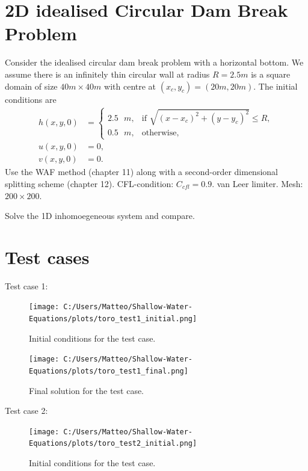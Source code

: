\section{2D idealised Circular Dam Break Problem}
Consider the idealised circular dam break problem with a horizontal bottom.
We assume there is an infinitely thin circular wall at radius $R = 2.5 m$ is a square domain of size $40 m \times 40 m$ with centre at $(x_c,y_c) = (20 m, 20 m)$.
The initial conditions are
\begin{align*}
    h(x,y,0) &= \begin{cases}
        2.5 \text{ }m, & \text{if } \sqrt{ {(x-x_c)}^2 + {(y-y_c)}^2 } \leq R, \\
        0.5 \text{ }m, & \text{otherwise},
    \end{cases} \\
    u(x,y,0) &= 0, \\
    v(x,y,0) &= 0.
\end{align*}
Use the WAF method (chapter 11) along with a second-order dimensional splitting scheme (chapter 12).
CFL-condition: $C_{cfl} = 0.9$.
van Leer limiter. Mesh: $200 \times 200$.

Solve the 1D inhomoegeneous system and compare.


\section{Test cases}

Test case 1:

\begin{figure}[H]
    \centering
    \texttt{[image: C:/Users/Matteo/Shallow-Water-Equations/plots/toro\_test1\_initial.png]}
    \caption{Initial conditions for the test case.}\label{fig:toro_test1_initial}
\end{figure}


\begin{figure}[H]
    \centering
    \texttt{[image: C:/Users/Matteo/Shallow-Water-Equations/plots/toro\_test1\_final.png]}
    \caption{Final solution for the test case.}\label{fig:toro_test1_final}
\end{figure}


Test case 2: 


\begin{figure}[H]
    \centering
    \texttt{[image: C:/Users/Matteo/Shallow-Water-Equations/plots/toro\_test2\_initial.png]}
    \caption{Initial conditions for the test case.}\label{fig:toro_test2_initial}
\end{figure}

